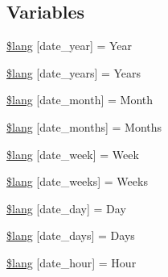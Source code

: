 \subsection*{Variables}
\begin{DoxyCompactItemize}
\item 
\hyperlink{_admin_2system_2language_2english_2date__lang_8php_ad344b819f5b881c0e2d75c994b8781b7}{\$lang} \mbox{[}\textquotesingle{}date\+\_\+year\textquotesingle{}\mbox{]} = \textquotesingle{}Year\textquotesingle{}
\item 
\hyperlink{_admin_2system_2language_2english_2date__lang_8php_ad553cabe66c6e6feff320f69fadfc561}{\$lang} \mbox{[}\textquotesingle{}date\+\_\+years\textquotesingle{}\mbox{]} = \textquotesingle{}Years\textquotesingle{}
\item 
\hyperlink{_admin_2system_2language_2english_2date__lang_8php_a27b6a453e0ff873f09050b0882b86b43}{\$lang} \mbox{[}\textquotesingle{}date\+\_\+month\textquotesingle{}\mbox{]} = \textquotesingle{}Month\textquotesingle{}
\item 
\hyperlink{_admin_2system_2language_2english_2date__lang_8php_af22d57f979004523c31e7252891b8ce1}{\$lang} \mbox{[}\textquotesingle{}date\+\_\+months\textquotesingle{}\mbox{]} = \textquotesingle{}Months\textquotesingle{}
\item 
\hyperlink{_admin_2system_2language_2english_2date__lang_8php_a027a67b9a8e626d4a9b4080f8100ca53}{\$lang} \mbox{[}\textquotesingle{}date\+\_\+week\textquotesingle{}\mbox{]} = \textquotesingle{}Week\textquotesingle{}
\item 
\hyperlink{_admin_2system_2language_2english_2date__lang_8php_af09796515b005d759204f911305a8459}{\$lang} \mbox{[}\textquotesingle{}date\+\_\+weeks\textquotesingle{}\mbox{]} = \textquotesingle{}Weeks\textquotesingle{}
\item 
\hyperlink{_admin_2system_2language_2english_2date__lang_8php_ab414526293ffead872f9b90ed4fdd552}{\$lang} \mbox{[}\textquotesingle{}date\+\_\+day\textquotesingle{}\mbox{]} = \textquotesingle{}Day\textquotesingle{}
\item 
\hyperlink{_admin_2system_2language_2english_2date__lang_8php_abb37886fce0ac3f342d17f4132740870}{\$lang} \mbox{[}\textquotesingle{}date\+\_\+days\textquotesingle{}\mbox{]} = \textquotesingle{}Days\textquotesingle{}
\item 
\hyperlink{_admin_2system_2language_2english_2date__lang_8php_a7a4e78ef1f19291c5a7818cf08bfa3ca}{\$lang} \mbox{[}\textquotesingle{}date\+\_\+hour\textquotesingle{}\mbox{]} = \textquotesingle{}Hour\textquotesingle{}

\end{DoxyCompactItemize}
